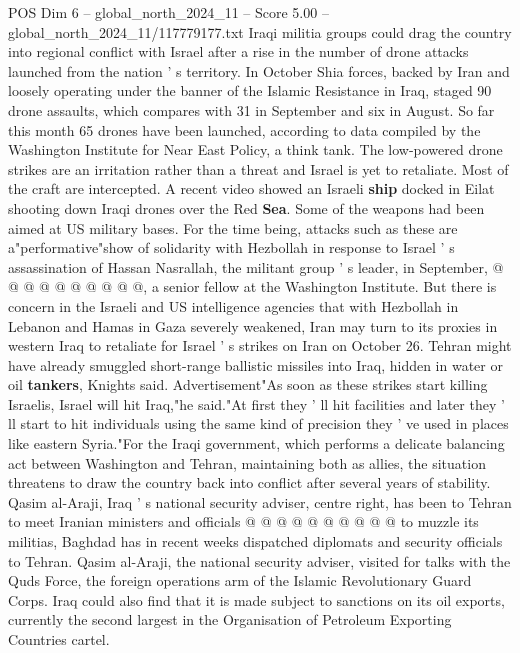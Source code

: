 \begin{textsample}{POS Dim 6 – global\_north\_2024\_11 – Score 5.00 – global\_north\_2024\_11/117779177.txt}  \label{ex:f6_pos_351}
Iraqi militia groups could drag the country into regional conflict with Israel after a rise in the number of drone attacks launched from the nation ' s territory.
In October Shia forces, backed by Iran and loosely operating under the banner of the Islamic Resistance in Iraq, staged 90 drone assaults, which compares with 31 in September and six in August.
So far this month 65 drones have been launched, according to data compiled by the Washington Institute for Near East Policy, a think tank.
The low-powered drone strikes are an irritation rather than a threat and Israel is yet to retaliate.
Most of the craft are intercepted.
A recent video showed an Israeli \textbf{ship} docked in Eilat shooting down Iraqi drones over the Red \textbf{Sea}.
Some of the weapons had been aimed at US military bases.
For the time being, attacks such as these are a"performative"show of solidarity with Hezbollah in response to Israel ' s assassination of Hassan Nasrallah, the militant group ' s leader, in September, @ @ @ @ @ @ @ @ @ @, a senior fellow at the Washington Institute.
But there is concern in the Israeli and US intelligence agencies that with Hezbollah in Lebanon and Hamas in Gaza severely weakened, Iran may turn to its proxies in western Iraq to retaliate for Israel ' s strikes on Iran on October 26.
Tehran might have already smuggled short-range ballistic missiles into Iraq, hidden in water or oil \textbf{tankers}, Knights said.
Advertisement"As soon as these strikes start killing Israelis, Israel will hit Iraq,"he said."At first they ' ll hit facilities and later they ' ll start to hit individuals using the same kind of precision they ' ve used in places like eastern Syria."For the Iraqi government, which performs a delicate balancing act between Washington and Tehran, maintaining both as allies, the situation threatens to draw the country back into conflict after several years of stability.
Qasim al-Araji, Iraq ' s national security adviser, centre right, has been to Tehran to meet Iranian ministers and officials @ @ @ @ @ @ @ @ @ @ to muzzle its militias, Baghdad has in recent weeks dispatched diplomats and security officials to Tehran.
Qasim al-Araji, the national security adviser, visited for talks with the Quds Force, the foreign operations arm of the Islamic Revolutionary Guard Corps.
Iraq could also find that it is made subject to sanctions on its oil exports, currently the second largest in the Organisation of Petroleum Exporting Countries cartel.

\end{textsample}
